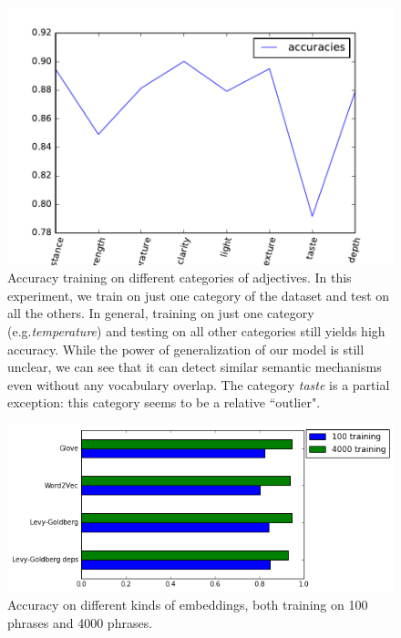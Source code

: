 \begin{figure}[h]
	\centering 
	\includegraphics[width=0.75\linewidth]{studies/stylevar2017/adjs_acc.pdf}
	\caption{\label{stylevar2017:fig:adj}Accuracy training on different categories of adjectives. In this experiment, we train on just one category of the dataset and test on all the others. In general, training on just one category (e.g.\textit{temperature}) and testing on all other categories still yields high accuracy. While the power of generalization of our model is still unclear, we can see that it can detect similar semantic mechanisms even without any vocabulary overlap.  The category \textit{taste} is a partial exception: this category seems to be a relative ``outlier". }
\end{figure}


\begin{figure}[h]
	\centering
	\includegraphics[width=0.85\linewidth]{studies/stylevar2017/embeddings.png}
	\caption{\label{stylevar2017:fig:emb} Accuracy on different kinds of embeddings, both training on 100 phrases and 4000 phrases.}
\end{figure}

